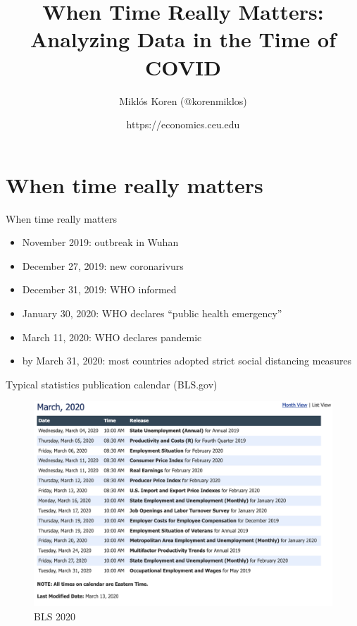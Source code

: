 \documentclass[ignorenonframetext,aspectratio=54,]{beamer}
\title{When Time Really Matters: Analyzing Data in the Time of COVID}
\author{Miklós Koren (@korenmiklos)}
\date{https://economics.ceu.edu}
\providecommand{\tightlist}{%
  \setlength{\itemsep}{0pt}\setlength{\parskip}{0pt}}
\begin{document}
\frame{\titlepage}

\hypertarget{when-time-really-matters}{%
\section{When time really matters}\label{when-time-really-matters}}

\begin{frame}{When time really matters}
\protect\hypertarget{when-time-really-matters-1}{}

\begin{itemize}
\tightlist
\item
  November 2019: outbreak in Wuhan
\item
  December 27, 2019: new coronarivurs
\item
  December 31, 2019: WHO informed
\item
  January 30, 2020: WHO declares ``public health emergency''
\item
  March 11, 2020: WHO declares pandemic
\item
  by March 31, 2020: most countries adopted strict social distancing
  measures
\end{itemize}

\end{frame}

\begin{frame}{Typical statistics publication calendar (BLS.gov)}
\protect\hypertarget{typical-statistics-publication-calendar-bls.gov}{}

\begin{figure}
\centering
\includegraphics{exhibit/fig/bls-march-2020.png}
\caption{BLS 2020}
\end{figure}

\end{frame}
\end{document}
